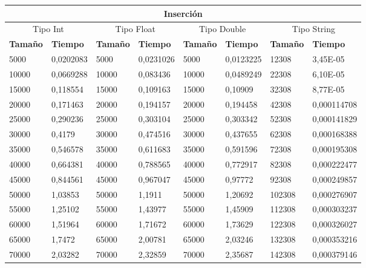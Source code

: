 \documentclass[11pt]{article}
\begin{document}
\begin{table}[!ht]
    \centering
    \small
    \begin{tabular}{|l|l|l|l|l|l|l|l|}
    \hline
    \multicolumn{8}{|c|}{\cellcolor{blue!20}\textbf{Inserción}} \\ \hline
    \multicolumn{2}{|c|}{\cellcolor{gray!20}Tipo Int} & \multicolumn{2}{c|}{\cellcolor{gray!20}Tipo Float} & \multicolumn{2}{c|}{\cellcolor{gray!20}Tipo Double} & \multicolumn{2}{c|}{\cellcolor{gray!20}Tipo String}\\ \hline
        \textbf{Tamaño} & \textbf{Tiempo} & \textbf{Tamaño} & \textbf{Tiempo} & \textbf{Tamaño} & \textbf{Tiempo} & \textbf{Tamaño} & \textbf{Tiempo} \\ \hline
        5000 & 0,0202083 & 5000 & 0,0231026 & 5000 & 0,0123225 & 12308 & 3,45E-05 \\ \hline
        10000 & 0,0669288 & 10000 & 0,083436 & 10000 & 0,0489249 & 22308 & 6,10E-05 \\ \hline
        15000 & 0,118554 & 15000 & 0,109163 & 15000 & 0,10909 & 32308 & 8,77E-05 \\ \hline
        20000 & 0,171463 & 20000 & 0,194157 & 20000 & 0,194458 & 42308 & 0,000114708 \\ \hline
        25000 & 0,290236 & 25000 & 0,303104 & 25000 & 0,303342 & 52308 & 0,000141829 \\ \hline
        30000 & 0,4179 & 30000 & 0,474516 & 30000 & 0,437655 & 62308 & 0,000168388 \\ \hline
        35000 & 0,546578 & 35000 & 0,611683 & 35000 & 0,591596 & 72308 & 0,000195308 \\ \hline
        40000 & 0,664381 & 40000 & 0,788565 & 40000 & 0,772917 & 82308 & 0,000222477 \\ \hline
        45000 & 0,844561 & 45000 & 0,967047 & 45000 & 0,97772 & 92308 & 0,000249857 \\ \hline
        50000 & 1,03853 & 50000 & 1,1911 & 50000 & 1,20692 & 102308 & 0,000276907 \\ \hline
        55000 & 1,25102 & 55000 & 1,43977 & 55000 & 1,45909 & 112308 & 0,000303237 \\ \hline
        60000 & 1,51964 & 60000 & 1,71672 & 60000 & 1,73629 & 122308 & 0,000326027 \\ \hline
        65000 & 1,7472 & 65000 & 2,00781 & 65000 & 2,03246 & 132308 & 0,000353216 \\ \hline
        70000 & 2,03282 & 70000 & 2,32859 & 70000 & 2,35687 & 142308 & 0,000379146 \\ \hline

\end{tabular}
\end{table}
\end{document}
